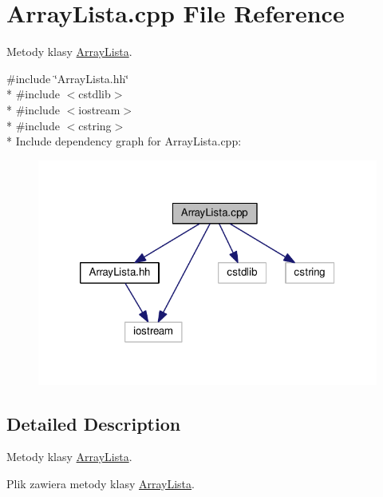 \hypertarget{a00007}{}\section{Array\+Lista.\+cpp File Reference}
\label{a00007}


Metody klasy \hyperlink{a00001}{Array\+Lista}.  


{\ttfamily \#include \char`\"{}Array\+Lista.\+hh\char`\"{}}\\*
{\ttfamily \#include $<$cstdlib$>$}\\*
{\ttfamily \#include $<$iostream$>$}\\*
{\ttfamily \#include $<$cstring$>$}\\*
Include dependency graph for Array\+Lista.\+cpp\+:\nopagebreak
\begin{figure}[H]
\begin{center}
\leavevmode
\includegraphics[width=320pt]{a00022}
\end{center}
\end{figure}


\subsection{Detailed Description}
Metody klasy \hyperlink{a00001}{Array\+Lista}. 

Plik zawiera metody klasy \hyperlink{a00001}{Array\+Lista}. 